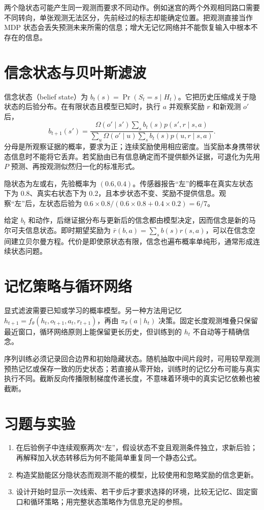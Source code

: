 \documentclass[UTF8,12pt,a4paper,fontset=fandol]{ctexbook}
\begin{document}
两个隐状态可能产生同一观测而要求不同动作。例如迷宫的两个外观相同路口需要不同转向，单张观测无法区分，先前经过的标志却能确定位置。把观测直接当作 MDP 状态会丢失预测未来所需的信息；增大无记忆网络并不能恢复输入中根本不存在的信息。

\section{信念状态与贝叶斯滤波}

信念状态（belief state）为 $b_t(s)=\Pr(S_t=s\mid H_t)$。它把历史压缩成关于隐状态的后验分布。在有限状态且模型已知时，执行 $a$ 并观察奖励 $r$ 和新观测 $o'$ 后，
\begin{equation}
b_{t+1}(s')=
\frac{\Omega(o'\mid s')\sum_s b_t(s)p(s',r\mid s,a)}
{\sum_u\Omega(o'\mid u)\sum_s b_t(s)p(u,r\mid s,a)}.
\label{eq:rl-belief-update}
\end{equation}
分母是所观察证据的概率，要求为正；连续奖励使用相应密度。当奖励本身携带状态信息时不能将它丢弃。若奖励由已有信息确定而不提供额外证据，可退化为先用 $P$ 预测、再按观测似然归一化的标准形式。

\begin{example}[一次有噪观测]
隐状态为左或右，先验概率为 $(0.6,0.4)$。传感器报告“左”的概率在真实左状态下为 $0.8$、真实右状态下为 $0.2$，且本步状态不变、奖励不提供信息。观察“左”后，左状态后验为 $0.6\times0.8/(0.6\times0.8+0.4\times0.2)=6/7$。
\end{example}

给定 $b_t$ 和动作，后继证据分布与更新后的信念都由模型决定，因而信念是新的马尔可夫信息状态。即时期望奖励为 $\bar r(b,a)=\sum_s b(s)r(s,a)$，可以在信念空间建立贝尔曼方程。代价是即使原状态有限，信念也遍布概率单纯形，通常形成连续状态问题。

\section{记忆策略与循环网络}

显式滤波需要已知或学习的概率模型。另一种方法用记忆 $h_{t+1}=f_\theta(h_t,o_{t+1},a_t,r_{t+1})$，再由 $\pi_\theta(a\mid h_t)$ 决策。固定长度观测堆叠只保留最近窗口，循环网络原则上能保留更长历史，但训练到的 $h_t$ 不自动等于精确信念。

序列训练必须记录回合边界和初始隐藏状态。随机抽取中间片段时，可用较早观测预热记忆或保存一致的历史状态；若直接从零开始，训练时的记忆分布可能与真实执行不同。截断反向传播限制梯度传递长度，不意味着环境中的真实记忆依赖也被截断。

\section{习题与实验}
\begin{enumerate}
\item 在后验例子中连续观察两次“左”，假设状态不变且观测条件独立，求新后验；再解释加入状态转移后为何不能简单重复同一个静态公式。
\item 构造奖励能区分隐状态而观测不能的模型，比较使用和忽略奖励的信念更新。
\item 设计开始时显示一次线索、若干步后才要求选择的环境，比较无记忆、固定窗口和循环策略；用完整状态策略作为信息充足的参照。
\end{enumerate}
\end{document}
